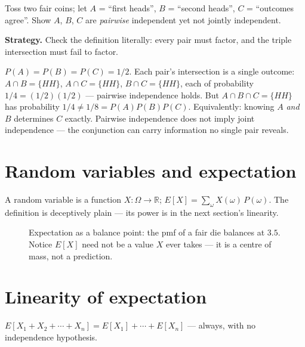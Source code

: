 \begin{example}\label{ex:pairwise}
Toss two fair coins; let $A$ = ``first heads'', $B$ = ``second
heads'', $C$ = ``outcomes agree''. Show $A$, $B$, $C$ are
\emph{pairwise} independent yet not jointly independent.
\par\smallskip
\textbf{Strategy.} Check the definition literally: every pair must
factor, and the triple intersection must fail to factor.
\par\smallskip
\begin{solution}
$P(A) = P(B) = P(C) = 1/2$. Each pair's intersection is a single
outcome: $A \cap B = \{HH\}$, $A \cap C = \{HH\}$, $B \cap C =
\{HH\}$, each of probability $1/4 = (1/2)(1/2)$ --- pairwise
independence holds. But $A \cap B \cap C = \{HH\}$ has probability
$1/4 \neq 1/8 = P(A)P(B)P(C)$. Equivalently: knowing $A$ \emph{and}
$B$ determines $C$ exactly. Pairwise independence does not imply joint
independence --- the conjunction can carry information no single pair
reveals.
\end{solution}
\end{example}

\section{Random variables and expectation}\label{sec:rv}
A random variable is a function $X : \Omega \to \mathbb{R}$;
$E[X] = \sum_\omega X(\omega)\,P(\omega)$. The definition is
deceptively plain --- its power is in the next section's linearity.

\begin{figure}[ht]\centering

\caption{Expectation as a balance point: the pmf of a fair die balances
at $3.5$. Notice $E[X]$ need not be a value $X$ ever takes --- it is a
centre of mass, not a prediction.}
\label{fig:exbalance}
\end{figure}

\section{Linearity of expectation}\label{sec:linexp}
\begin{theorem}
$E[X_1 + X_2 + \cdots + X_n] = E[X_1] + \cdots + E[X_n]$
--- always, with no independence hypothesis.
\end{theorem}


